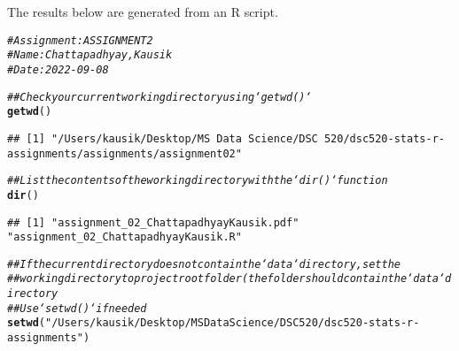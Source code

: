 \documentclass{article}\usepackage[]{graphicx}\usepackage[]{xcolor}
\makeatletter
\newcommand{\hlstr}[1]{\textcolor[rgb]{0.192,0.494,0.8}{#1}}%
\newcommand{\hlcom}[1]{\textcolor[rgb]{0.678,0.584,0.686}{\textit{#1}}}%
\newcommand{\hlstd}[1]{\textcolor[rgb]{0.345,0.345,0.345}{#1}}%
\newcommand{\hlkwd}[1]{\textcolor[rgb]{0.737,0.353,0.396}{\textbf{#1}}}%
\newenvironment{kframe}{%
 \def\at@end@of@kframe{}%
 \ifinner\ifhmode%
  \def\at@end@of@kframe{\end{minipage}}%
  \begin{minipage}{\columnwidth}%
 \fi\fi%
 \def\FrameCommand##1{\hskip\@totalleftmargin \hskip-\fboxsep
 \colorbox{shadecolor}{##1}\hskip-\fboxsep
     \hskip-\linewidth \hskip-\@totalleftmargin \hskip\columnwidth}%
 \MakeFramed {\advance\hsize-\width
   \@totalleftmargin\z@ \linewidth\hsize
   \@setminipage}}%
 {\par\unskip\endMakeFramed%
 \at@end@of@kframe}
\newenvironment{knitrout}{}{} %
\makeatother
\begin{document}
The results below are generated from an R script.

\begin{knitrout}
\color{fgcolor}\begin{kframe}
\begin{alltt}
\hlcom{# Assignment: ASSIGNMENT 2}
\hlcom{# Name: Chattapadhyay, Kausik}
\hlcom{# Date: 2022-09-08}

\hlcom{## Check your current working directory using `getwd()`}
\hlkwd{getwd}\hlstd{()}
\end{alltt}
\begin{verbatim}
## [1] "/Users/kausik/Desktop/MS Data Science/DSC 520/dsc520-stats-r-assignments/assignments/assignment02"
\end{verbatim}
\begin{alltt}
\hlcom{## List the contents of the working directory with the `dir()` function}
\hlkwd{dir}\hlstd{()}
\end{alltt}
\begin{verbatim}
## [1] "assignment_02_ChattapadhyayKausik.pdf" "assignment_02_ChattapadhyayKausik.R"
\end{verbatim}
\begin{alltt}
\hlcom{## If the current directory does not contain the `data` directory, set the}
\hlcom{## working directory to project root folder (the folder should contain the `data` directory}
\hlcom{## Use `setwd()` if needed}
\hlkwd{setwd}\hlstd{(}\hlstr{"/Users/kausik/Desktop/MS Data Science/DSC 520/dsc520-stats-r-assignments"}\hlstd{)}


\end{alltt}
\end{kframe}
\end{knitrout}
\end{document}
